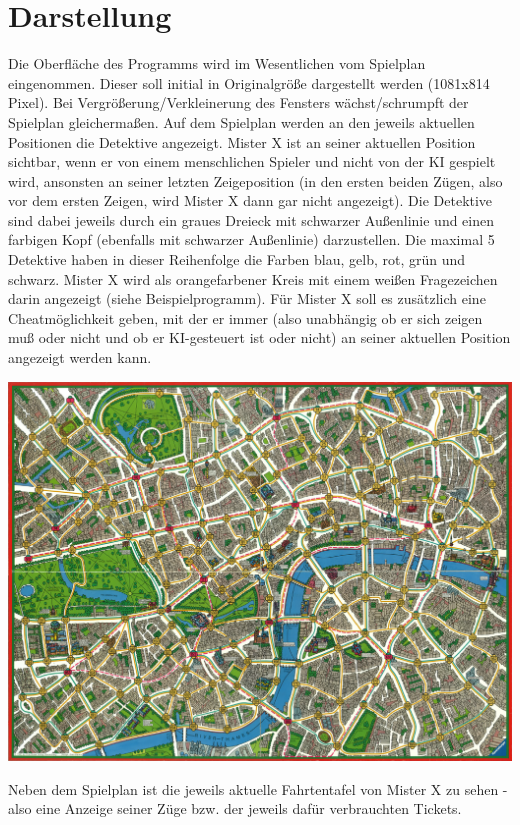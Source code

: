     \section{Darstellung}
        Die Oberfläche des Programms wird im Wesentlichen vom Spielplan eingenommen. 
        Dieser soll initial in Originalgröße dargestellt werden (1081x814 Pixel). 
        Bei Vergrößerung/Verkleinerung des Fensters wächst/schrumpft der Spielplan gleichermaßen. 
        Auf dem Spielplan werden an den jeweils aktuellen Positionen die Detektive angezeigt. 
        Mister X ist an seiner aktuellen Position sichtbar, wenn er von einem menschlichen Spieler und nicht von der KI gespielt wird, ansonsten an seiner letzten Zeigeposition (in den ersten beiden Zügen, also vor dem ersten Zeigen, wird Mister X dann gar nicht angezeigt). 
        Die Detektive sind dabei jeweils durch ein graues Dreieck mit schwarzer Außenlinie und einen farbigen Kopf (ebenfalls mit schwarzer Außenlinie) darzustellen. Die maximal 5 Detektive haben in dieser Reihenfolge die Farben blau, gelb, rot, grün und schwarz. 
        Mister X wird als orangefarbener Kreis mit einem weißen Fragezeichen darin angezeigt (siehe Beispielprogramm). Für Mister X soll es zusätzlich eine Cheatmöglichkeit geben, mit der er immer (also unabhängig ob er sich zeigen muß oder nicht und ob er KI-gesteuert ist oder nicht) an seiner aktuellen Position angezeigt werden kann.
        \begin{center}
            \includegraphics[scale=0.3]{img/einleitung/Spielplan.png}
        \end{center}
        Neben dem Spielplan ist die jeweils aktuelle Fahrtentafel von Mister X zu sehen - also eine Anzeige seiner Züge bzw. der jeweils dafür verbrauchten Tickets.
